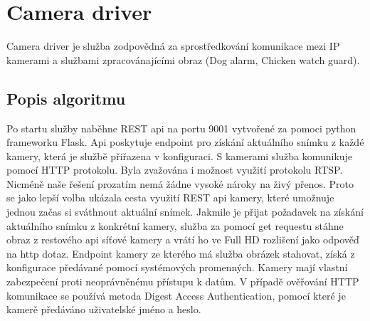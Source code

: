 \section{Camera driver}\label{sec:camera-driver}
Camera driver je služba zodpovědná za sprostředkování komunikace mezi IP kamerami a službami zpracovánajícími obraz (Dog alarm, Chicken watch guard).\newline

\subsection*{Popis algoritmu}
Po startu služby naběhne REST api na portu 9001 vytvořené za pomoci python frameworku Flask.
Api poskytuje endpoint pro získání aktuálního snímku z každé kamery, která je službě přiřazena v konfiguraci.
S kamerami služba komunikuje pomocí HTTP protokolu.
Byla zvažována i možnost využití protokolu RTSP.
Nicméně naše řešení prozatím nemá žádne vysoké nároky na živý přenos.
Proto se jako lepší volba ukázala cesta využití REST api kamery, které umožnuje jednou začas si sváthnout aktuální snímek.
Jakmile je přijat požadavek na získání aktuálního snímku z konkrétní kamery, služba za pomocí get requestu stáhne obraz z restového api síťové kamery a vrátí ho ve Full HD rozlišení jako odpověď na http dotaz.
Endpoint kamery ze kterého má služba obrázek stahovat, získá z konfigurace předávané pomocí systémových promenných.
Kamery mají vlastní zabezpečení proti neoprávněnému přístupu k datům.
V případě ověřování HTTP komunikace se používá metoda Digest Access Authentication, pomocí které je kamerě předáváno uživatelské jméno a heslo.


%
%
%
%

